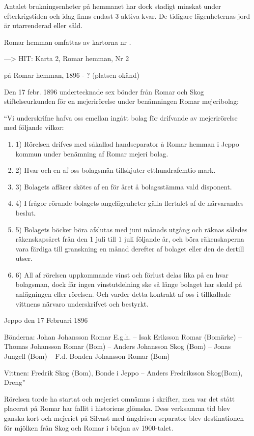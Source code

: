 Antalet brukningsenheter på hemmanet har dock stadigt minskat under efterkrigstiden och idag finns endast 3 aktiva kvar. De tidigare lägenheternas jord är utarrenderad eller såld.


Romar hemman omfattas av kartorna nr .


---> HIT: Karta 2, Romar hemman, Nr 2


 på Romar hemman, 1896 - ? (platsen okänd)

Den 17 febr. 1896 undertecknade sex bönder från Romar och Skog stiftelseurkunden för en mejerirörelse under benämningen Romar mejeribolag:

``Vi underskrifne hafva oss emellan ingått bolag för drifvande av mejerirörelse med följande vilkor:
\begin{enumerate}
  \item 1) Rörelsen drifves med såkallad handseparator å Romar hemman i Jeppo kommun under benämning af Romar mejeri bolag.
  \item 2) Hvar och en af oss bolagsmän tillskjuter etthundrafemtio mark.
  \item 3) Bolagets affärer skötes af en för året å bolagsstämma vald disponent.
  \item 4) I frågor rörande bolagets angelägenheter gälla flertalet af de närvarandes beslut.
  \item 5) Bolagets böcker böra afslutas med juni månads utgång och räknas således räkenskapsåret från den 1 juli till 1 juli följande år, och böra räkenskaperna vara färdiga till granskning en månad derefter af bolaget eller den de dertill utser.
  \item 6) All af rörelsen uppkommande vinst och förlust delas lika på en hvar bolagsman, dock får ingen vinstutdelning ske så länge bolaget har skuld på anlägningen eller rörelsen. Och varder detta kontrakt af oss i tillkallade vittnens närvaro underskrifvet och bestyrkt.
\end{enumerate}

Jeppo den 17 Februari 1896

Bönderna:
Johan Johansson Romar  E.g.h. -- Isak Eriksson Romar (Bomärke) --  Thomas Johansson Romar (Bom) -- Anders Johansson Skog  (Bom) -- Jonas Jungell (Bom) -- F.d. Bonden Johansson Romar (Bom)

Vittnen:
Fredrik Skog (Bom), Bonde i Jeppo -- Anders Fredriksson Skog(Bom), Dreng''

Rörelsen torde ha startat och mejeriet omnämns i skrifter, men var det stått placerat på Romar har fallit i historiens glömska. Dess verksamma tid blev ganska kort och mejeriet på Silvast med ångdriven separator blev destinationen för mjölken från Skog och Romar i början av 1900-talet.


